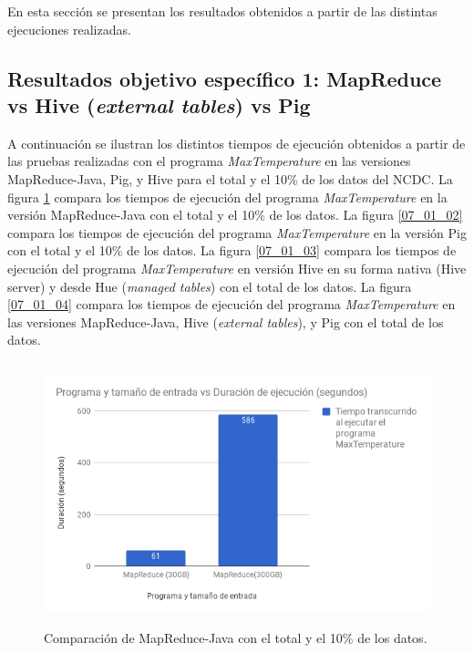 En esta sección se presentan los resultados obtenidos a partir de las distintas ejecuciones realizadas. \\

\subsection{Resultados objetivo específico 1: MapReduce vs Hive (\textit{external tables}) vs Pig}

A continuación se ilustran los distintos tiempos de ejecución obtenidos a partir de las pruebas realizadas con el programa \textit{MaxTemperature} en las versiones MapReduce-Java, Pig, y Hive para el total y el 10\% de los datos del NCDC. La figura \ref{07_01_01} compara los tiempos de ejecución del programa \textit{MaxTemperature} en la versión MapReduce-Java con el total y el 10\% de los datos. La figura \ref{07_01_02} compara los tiempos de ejecución del programa \textit{MaxTemperature} en la versión Pig con el total y el 10\% de los datos. La figura \ref{07_01_03} compara los tiempos de ejecución del programa \textit{MaxTemperature} en versión Hive en su forma nativa (Hive server) y desde Hue (\textit{managed tables}) con el total de los datos. La figura \ref{07_01_04} compara los tiempos de ejecución del programa \textit{MaxTemperature} en las versiones MapReduce-Java, Hive (\textit{external tables}), y Pig con el total de los datos.

\begin{figure}[H]
  \centering
      \includegraphics[width=\textwidth, height=3.0in]{fig/07/01_01}
  \caption{Comparación de MapReduce-Java con el total y el 10\% de los datos.}
  \label{07_01_01}
\end{figure}

